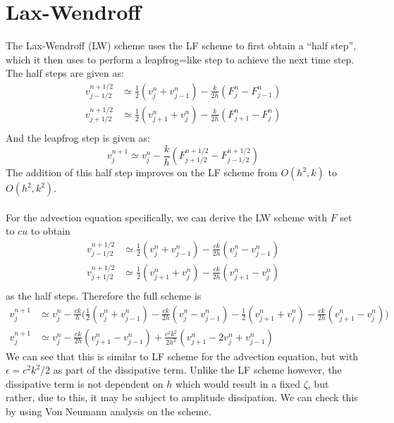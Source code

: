 \section{Lax-Wendroff}
The Lax-Wendroff (LW) scheme uses the LF scheme to first obtain a ``half step'', which it then uses to perform a leapfrog=like step to achieve the next time step. The half steps are given as:
\begin{equation*}
  \begin{aligned}
  v^{n+1/2}_{j-1/2} &\simeq \frac{1}{2}(v^n_j + v^n_{j-1}) - \frac{k}{2h}(F^n_j-F^n_{j-1})\\
  v^{n+1/2}_{j+1/2} &\simeq \frac{1}{2}(v^n_{j+1} + v^n_j) - \frac{k}{2h}(F^n_{j+1}-F^n_j)\\
  \end{aligned}
\end{equation*}
And the leapfrog step is given as:
\begin{equation*}
  v^{n+1}_j \simeq v^n_j-\frac{k}{h}(F^{n+1/2}_{j+1/2}-F^{n+1/2}_{j-1/2})
\end{equation*}
The addition of this half step improves on the LF scheme from $O(h^2,k)$ to $O(h^2,k^2)$.
\\
\\
For the advection equation specifically, we can derive the LW scheme with $F$ set to $cu$ to obtain
\begin{equation*}
\begin{aligned}
  v^{n+1/2}_{j-1/2} &\simeq \frac{1}{2}(v^n_j + v^n_{j-1}) - \frac{ck}{2h}(v^n_j-v^n_{j-1})\\
  v^{n+1/2}_{j+1/2} &\simeq \frac{1}{2}(v^n_{j+1} + v^n_j) - \frac{ck}{2h}(v^n_{j+1}-v^n_j)\\
\end{aligned}
\end{equation*}
as the half steps. Therefore the full scheme is
\begin{equation*}
\begin{aligned}
  v^{n+1}_j &\simeq v^n_j-\frac{ck}{h}\big(\frac{1}{2}(v^n_j + v^n_{j-1}) - \frac{ck}{2h}(v^n_j-v^n_{j-1})- \frac{1}{2}(v^n_{j+1} + v^n_j) - \frac{ck}{2h}(v^n_{j+1}-v^n_j)\big)\\
  v^{n+1}_j &\simeq v^n_j-\frac{ck}{2h}(v^n_{j+1} - v^n_{j-1}) + \frac{c^2k^2}{2h^2}(v^n_{j+1} -2v^n_j + v^n_{j-1})
\end{aligned}
\end{equation*}
We can see that this is similar to LF scheme for the advection equation, but with $\epsilon=c^2k^2/2$ as part of the dissipative term. Unlike the LF scheme however, the dissipative term is not dependent on $h$ which would result in a fixed $\zeta$, but rather, due to this, it may be subject to amplitude dissipation. We can check this by using Von Neumann analysis on the scheme.
